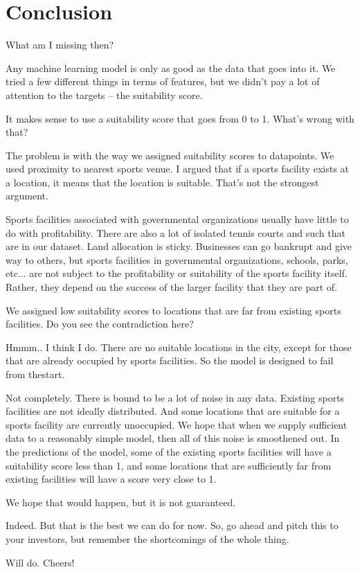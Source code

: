 \chapter{Conclusion}\label{chap:conclusion}

{\color{blue} What am I missing then?}

Any machine learning model is only as good as the data that goes into it. We tried a few different things in terms of features, but we didn't pay a lot of attention to the targets -- the suitability score. 

{\color{blue} It makes sense to use a suitability score that goes from 0 to 1. What's wrong with that?}

The problem is with the way we assigned suitability scores to datapoints. We used proximity to nearest sports venue. I argued that if a sports facility exists at a location, it means that the location is suitable. That's not the strongest argument. 

Sports facilities associated with governmental organizations usually have little to do with profitability. There are also a lot of isolated tennis courts and such that are in our dataset. Land allocation is sticky. Businesses can go bankrupt and give way to others, but sports facilities in governmental organizations, schools, parks, etc... are not subject to the profitability or suitability of the sports facility itself. Rather, they depend on the success of the larger facility that they are part of. 

We assigned low suitability scores to locations that are far from existing sports facilities. Do you see the contradiction here?

{\color{blue} Hmmm.. I think I do. There are no suitable locations in the city, except for those that are already occupied by sports facilities. So the model is designed to fail from thestart.}

Not completely. There is bound to be a lot of noise in any data. Existing sports facilities are not ideally distributed. And some locations that are suitable for a sports facility are currently unoccupied. We hope that when we supply sufficient data to a reasonably simple model, then all of this noise is smoothened out. In the predictions of the model, some of the existing sports facilities will have a suitability score less than 1, and some locations that are sufficiently far from existing facilities will have a score very close to 1. 


{\color{blue} We hope that would happen, but it is not guaranteed.}

Indeed. But that is the best we can do for now. So, go ahead and pitch this to your investors, but remember the shortcomings of the whole thing. 

{\color{blue} Will do. Cheers!}
